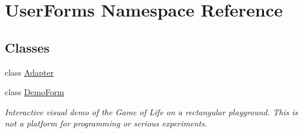\hypertarget{namespace_user_forms}{}\section{User\+Forms Namespace Reference}
\label{namespace_user_forms}
\subsection*{Classes}
\begin{DoxyCompactItemize}
\item 
class \hyperlink{class_user_forms_1_1_adapter}{Adapter}
\item 
class \hyperlink{class_user_forms_1_1_demo_form}{Demo\+Form}
\begin{DoxyCompactList}\small\item\em Interactive visual demo of the Game of Life on a rectangular playground. This is not a platform for programming or serious experiments. \end{DoxyCompactList}\end{DoxyCompactItemize}

